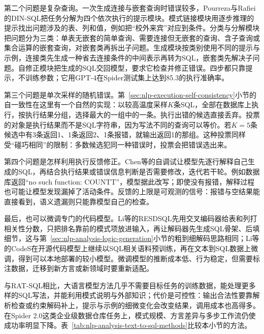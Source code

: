 第二个问题是复杂查询。一次生成连接与嵌套查询时错误较多，Pourreza与Rafiei的DIN-SQL把任务分解为四个依次执行的提示模块。模式链接模块用逐步推理的提示找出问题涉及的表、列和值，例如把“校外来宾”对应到条件。分类与分解模块把问题分为三类：单表无嵌套的简单查询、需要连接但无嵌套的查询、含子查询或集合运算的嵌套查询，对嵌套类再拆出子问题。生成模块按类别使用不同的提示与示例，连接类先生成一种省去连接条件的中间表示再转为SQL，嵌套类先解决子问题。自修正模块把生成的SQL交回模型，要求它检查并修正错误。四步都只靠提示，不训练参数；它用GPT-4在Spider测试集上达到85.3的执行准确率。

第三个问题是单次采样的随机错误。第~\ref{sec:nlp-execution-self-consistency}小节的自一致性在这里有一个自然的实现：以较高温度采样$K$条SQL，全部在数据库上执行，按执行结果分组，选择最大的一组中的一条。执行出错的候选直接丢弃。投票的对象是执行结果而不是SQL字符串，因为写法不同的查询可以等价。若$K=5$条候选中有3条返回1、1条返回2、1条报错，就输出返回1的那组。这种投票同样受“碰巧相同”的限制：多数候选犯同一种错误时，投票会把错误选出来。

第四个问题是怎样利用执行反馈修正。Chen等的自调试让模型先逐行解释自己生成的SQL，再结合执行结果或错误信息判断是否需要修改，迭代若干轮。例如数据库返回“no such function: COUNTT”，模型据此改写；即使没有报错，解释过程也可能让模型发现漏掉了活动条件。反馈的上限是可观测的信号：报错与空结果能直接看到，语义遗漏则只能靠模型自己的检查。

最后，也可以微调专门的代码模型。Li等的RESDSQL先用交叉编码器给表和列打相关性分数，只把排名靠前的模式项放进输入，再让解码器先生成SQL骨架、后填细节，这与第~\ref{sec:nlp-analysis-logic-generation}小节的粗到细解码思路相同\cite{nlp-analysis-li2023resdsql}；Li等的CodeS在开源代码模型上继续以SQL相关语料预训练，再在文本到SQL数据上微调，得到可以本地部署的较小模型。微调模型的推断成本低、行为稳定，但需要标注数据，迁移到新方言或新领域时要重新适配。

与RAT-SQL相比，大语言模型方法几乎不需要目标任务的训练数据，能处理更多样的SQL写法，并能利用模式说明与外部知识；代价是可控性：输出合法性要靠解析检查或约束解码补上，提示与示例的细微变化会改变结果，调用成本也高得多。在Spider 2.0这类企业级数据仓库任务上，模式规模、方言差异与多步工作流仍使成功率明显下降。表~\ref{tab:nlp-analysis-text-to-sql-methods}比较本小节的方法。

